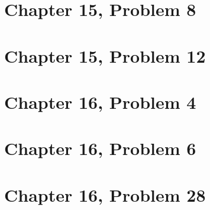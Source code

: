 \documentclass[12pt]{article}
\begin{document}
\section*{Chapter 15, Problem 8}

\section*{Chapter 15, Problem 12}

\section*{Chapter 16, Problem 4}

\section*{Chapter 16, Problem 6}

\section*{Chapter 16, Problem 28}
\end{document}
